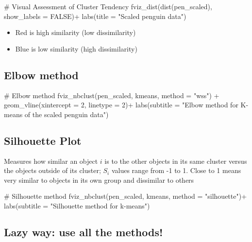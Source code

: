 \documentclass[
  letterpaper,
  DIV=11,
  numbers=noendperiod]{scrreprt}
\newenvironment{Shaded}{\begin{snugshade}}{\end{snugshade}}
\newcommand{\NormalTok}[1]{\textcolor[rgb]{0.00,0.23,0.31}{#1}}
\providecommand{\tightlist}{%
  \setlength{\itemsep}{0pt}\setlength{\parskip}{0pt}}\usepackage{longtable,booktabs,array}
\begin{document}
\begin{Shaded}
\begin{Highlighting}[]
\NormalTok{\# Visual Assessment of Cluster Tendency}
\NormalTok{fviz\_dist(dist(pen\_scaled), show\_labels = FALSE)+ labs(title = "Scaled penguin data")}
\end{Highlighting}
\end{Shaded}

\begin{itemize}
\tightlist
\item
  Red is high similarity (low dissimilarity)
\item
  Blue is low similarity (high dissimilarity)
\end{itemize}

\subsection{Elbow method}\label{elbow-method}

\begin{Shaded}
\begin{Highlighting}[]
\NormalTok{\# Elbow method}
\NormalTok{fviz\_nbclust(pen\_scaled, kmeans, method = "wss") + geom\_vline(xintercept = 2, linetype = 2)+}
\NormalTok{labs(subtitle = "Elbow method for K{-}means of the scaled penguin data")}
\end{Highlighting}
\end{Shaded}

\subsection{Silhouette Plot}\label{silhouette-plot}

Measures how similar an object \(i\) is to the other objects in its same
cluster versus the objects outside of its cluster; \(S_i\) values range
from -1 to 1. Close to 1 means very similar to objects in its own group
and dissimilar to others

\begin{Shaded}
\begin{Highlighting}[]
\NormalTok{\# Silhouette method}
\NormalTok{fviz\_nbclust(pen\_scaled, kmeans, method = "silhouette")+ labs(subtitle = "Silhouette method for k{-}means")}
\end{Highlighting}
\end{Shaded}

\subsection{Lazy way: use all the
methods!}\label{lazy-way-use-all-the-methods}
\end{document}
